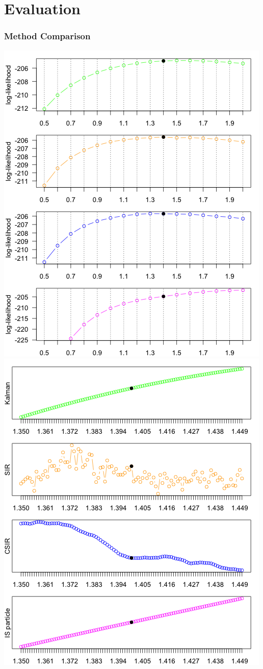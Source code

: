\documentclass[11pt]{beamer}
\begin{document}
\section{Evaluation}

\begin{frame}
\frametitle{Method Comparison}
\centering
\includegraphics[scale=0.30]{ullm-loglik-eta}
\includegraphics[scale=0.30]{ullm-loglik-zoom}

\end{frame}
\end{document}
